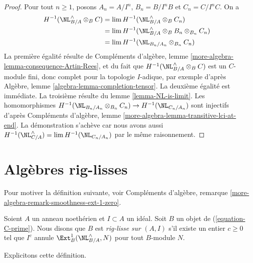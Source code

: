 \begin{proof}
Pour tout $n \geq 1$, posons $A_n = A/I^n$, $B_n = B/I^nB$ et
$C_n = C/I^nC$. On a
\begin{align*}
H^{-1}(\NL_{B/A}^\wedge \otimes_B C)
& =
\lim H^{-1}(\NL_{B/A}^\wedge \otimes_B C_n) \\
& =
\lim H^{-1}(\NL_{B/A}^\wedge \otimes_B B_n \otimes_{B_n} C_n) \\
& =
\lim H^{-1}(\NL_{B_n/A_n} \otimes_{B_n} C_n)
\end{align*}
La première égalité résulte de Compléments d'algèbre, lemme
\ref{more-algebra-lemma-consequence-Artin-Rees}, et du fait que
$H^{-1}(\NL_{B/A}^\wedge \otimes_B C)$ est un $C$-module fini, donc complet
pour la topologie $I$-adique, par exemple d'après Algèbre, lemme
\ref{algebra-lemma-completion-tensor}. La deuxième égalité est immédiate. La
troisième résulte du lemme \ref{lemma-NL-is-limit}. Les homomorphismes
$H^{-1}(\NL_{B_n/A_n} \otimes_{B_n} C_n) \to H^{-1}(\NL_{C_n/A_n})$ sont
injectifs d'après Compléments d'algèbre, lemme
\ref{more-algebra-lemma-transitive-lci-at-end}. La démonstration s'achève car
nous avons aussi
$H^{-1}(\NL_{C/A}^\wedge) = \lim H^{-1}(\NL_{C_n/A_n})$
par le même raisonnement.
\end{proof}









\section{Algèbres rig-lisses}
\label{section-rig-smooth}

\noindent
Pour motiver la définition suivante, voir Compléments d'algèbre, remarque
\ref{more-algebra-remark-smoothness-ext-1-zero}.

\begin{definition}
\label{definition-rig-smooth-homomorphism}
Soient $A$ un anneau noethérien et $I \subset A$ un idéal. Soit $B$ un objet
de (\ref{equation-C-prime}). Nous disons que $B$ est {\it rig-lisse sur
$(A, I)$} s'il existe un entier $c \geq 0$ tel que $I^c$ annule
$\Ext^1_B(\NL_{B/A}^\wedge, N)$ pour tout $B$-module $N$.
\end{definition}

\noindent
Explicitons cette définition.

